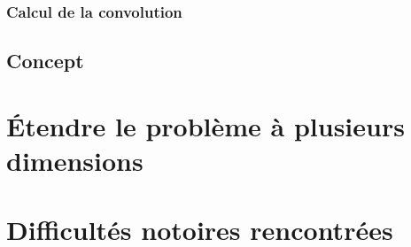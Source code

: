 \subsubsection{Calcul de la convolution}
\label{Automatisation du processus d'investigation: Reconnaissance de motifs: Différentes approches étudiées: Calcul de la convolution}

\subsection{Concept}
\label{Automatisation du processus d'investigation: Reconnaissance de motifs: Concept}



\section{Étendre le problème à plusieurs dimensions }
\label{Automatisation du processus d'investigation: Étendre le problème à plusieurs dimensions}



\section{Difficultés notoires rencontrées}
\label{Automatisation du processus d'investigation: Difficultés notoires rencontrées}


